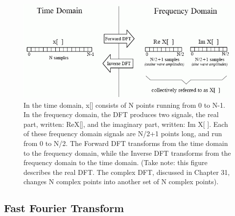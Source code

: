 \documentclass[a4paper,12pt]{article}
\begin{document}
\begin{figure}[h!]
 \label{fig:F_8_3}
 \centering
 \includegraphics[width=\textwidth, keepaspectratio=true]{F_8_3}
 \caption{In the time domain, x[] consists of N points running from 0 to N-1. In the frequency domain,
the DFT produces two signals, the real part, written: ReX[], and the imaginary part, written: Im X[ ]. Each of
these frequency domain signals are N/2+1 points long, and run from 0 to N/2. The Forward DFT transforms from
the time domain to the frequency domain, while the Inverse DFT transforms from the frequency domain to the
time domain. (Take note: this figure describes the real DFT. The complex DFT, discussed in Chapter 31,
changes N complex points into another set of N complex points).}
\end{figure}

\subsection{Fast Fourier Transform}
\end{document}
